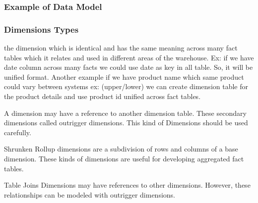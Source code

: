 \begin{frame}
\frametitle{Example of Data Model}


\end{frame}

\begin{frame}
\frametitle{Dimensions Types}



	\begin{description}[<+->]
		\item[Conformed Dimensions]	the dimension which is identical and has the same meaning across many fact tables which it relates and used in different areas of the warehouse. Ex: if we have date column across many facts we could use date as key in all table. So, it will be unified format. Another example if we have product name which same product could vary between systems ex: (upper/lower) we can create dimension table for the product details and use product id unified across fact tables. 
		
		\item[Outrigger Dimensions]	A dimension may have a reference to another dimension table. These secondary dimensions called outrigger dimensions. This kind of Dimensions should be used carefully.
		\item[Shrunken Rollup Dimensions]	Shrunken Rollup dimensions are a subdivision of rows and columns of a base dimension. These kinds of dimensions are useful for developing aggregated fact tables.
		\item[Dimension-to-Dimension] Table Joins	Dimensions may have references to other dimensions. However, these relationships can be modeled with outrigger dimensions.
	\end{description}
\end{frame}

